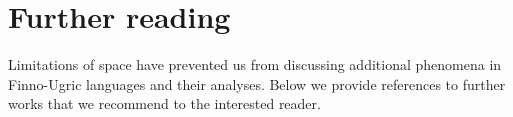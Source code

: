 \documentclass[output=paper,hidelinks]{langscibook}
\begin{document}
\ea%
\label{ex:FinnoUgric:98}
\ea\label{ex:FinnoUgric:98a}
\ex\label{ex:FinnoUgric:98b}
\z\z

\section{Further reading}
\label{sec:FinnoUgric:9}

Limitations of space have prevented us from discussing additional phenomena in Finno-Ugric languages and their analyses. Below we provide references to further works that we recommend to the interested reader.
\end{document}
